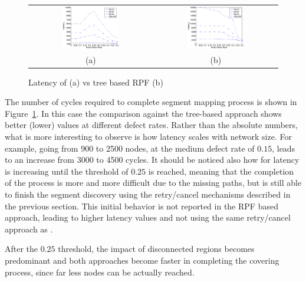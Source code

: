 \begin{figure}
\centering
\begin{tabular}{cc}
\includegraphics[width=0.48\textwidth]{pictures/set2.eps} & 
\includegraphics[width=0.48\textwidth]{pictures/set2_rpf.eps} \\
(a) & (b)
\end{tabular}
\caption{Latency of \disr{} (a) vs tree based RPF (b) }
\label{fig:results_latency}
\end{figure}

The number of cycles required to complete segment mapping process is
shown in Figure~\ref{fig:results_latency}. In this case the comparison
against the tree-based approach shows better (lower) values at
different defect rates. Rather than the absolute numbers, what is more
interesting to observe is how \disr{} latency scales with network
size. For example, going from 900 to 2500 nodes, at the medium defect
rate of $0.15$, leads to an increase from 3000 to 4500 cycles. It
should be noticed also how for \disr{} latency is increasing until the
threshold of $0.25$ is reached, meaning that the completion of the
process is more and more difficult due to the missing paths, but
\disr{} is still able to finish the segment discovery using the retry/cancel mechanisms
described in the previous section. This initial behavior is not reported in
the RPF based approach, leading to higher latency values and not using
the same retry/cancel approach as \disr{}.

After the $0.25$ threshold, the impact of disconnected regions
becomes predominant and both approaches become faster in completing
the covering process, since far less nodes can be actually reached. 

